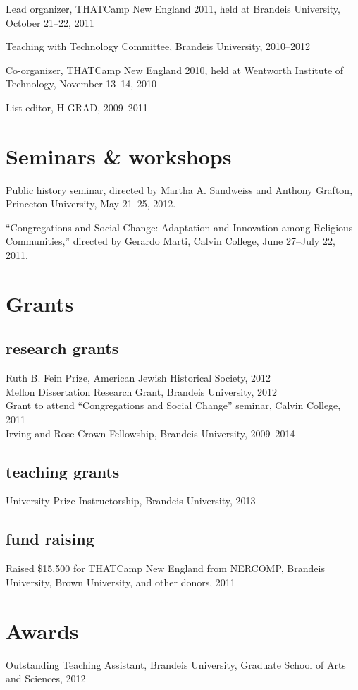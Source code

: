 \documentclass[11pt]{article}
\begin{document}
Lead organizer, THATCamp New England 2011, held at Brandeis University, 
October 21--22, 2011

Teaching with Technology Committee, Brandeis University, 2010--2012

Co-organizer, THATCamp New England 2010, held at Wentworth Institute of 
Technology, November 13--14, 2010

List editor, H-GRAD, 2009--2011

\section{Seminars \& workshops}
Public history seminar, directed by Martha A. Sandweiss and 
Anthony Grafton, Princeton University, May 21--25, 2012.

``Congregations and Social Change: Adaptation and Innovation among 
Religious Communities,'' directed by Gerardo Marti, Calvin College, June 
27--July 22, 2011.

\section{Grants}

\subsection{research grants}
\noindent
Ruth B. Fein Prize, American Jewish Historical Society, 2012\\
Mellon Dissertation Research Grant, Brandeis University, 2012\\
Grant to attend ``Congregations and Social Change'' seminar, Calvin 
College, 2011\\
Irving and Rose Crown Fellowship, Brandeis University, 2009--2014

\subsection{teaching grants}
\noindent
University Prize Instructorship, Brandeis University, 2013

\subsection{fund raising}
\noindent
Raised \$15,500 for THATCamp New England from NERCOMP, Brandeis 
University, Brown University, and other donors, 2011

\section{Awards}
\noindent
Outstanding Teaching Assistant, Brandeis University, Graduate School of 
Arts and Sciences, 2012
\end{document}
